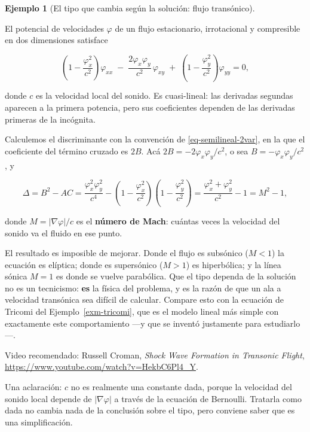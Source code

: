 \documentclass[
  spanish,
  a4paper,
]{scrbook}
\theoremstyle{definition}
\theoremstyle{plain}
\theoremstyle{definition}
\newtheorem{example}{Ejemplo}[chapter]
\theoremstyle{plain}
\theoremstyle{definition}
\theoremstyle{remark}
\begin{document}
\begin{example}[El tipo que cambia según la solución: flujo
transónico]\protect\hypertarget{exm-transonico}{}\label{exm-transonico}

El potencial de velocidades \(\varphi\) de un flujo estacionario,
irrotacional y compresible en dos dimensiones satisface

\[
\left(1 - \frac{\varphi_x^2}{c^2}\right)\varphi_{xx}
\;-\; \frac{2\varphi_x\varphi_y}{c^2}\,\varphi_{xy}
\;+\; \left(1 - \frac{\varphi_y^2}{c^2}\right)\varphi_{yy} = 0 ,
\]

donde \(c\) es la velocidad local del sonido. Es cuasi-lineal: las
derivadas segundas aparecen a la primera potencia, pero sus coeficientes
dependen de las derivadas primeras de la incógnita.

Calculemos el discriminante con la convención de
\ref{eq-semilineal-2var}, en la que el coeficiente del término cruzado
es \(2B\). Acá \(2B = -2\varphi_x\varphi_y/c^2\), o sea
\(B = -\varphi_x\varphi_y/c^2\), y

\[
\Delta = B^2 - AC
= \frac{\varphi_x^2\varphi_y^2}{c^4}
- \left(1-\frac{\varphi_x^2}{c^2}\right)\left(1-\frac{\varphi_y^2}{c^2}\right)
= \frac{\varphi_x^2 + \varphi_y^2}{c^2} - 1 = M^2 - 1 ,
\]

donde \(M = |\nabla\varphi|/c\) es el \textbf{número de Mach}: cuántas
veces la velocidad del sonido va el fluido en ese punto.

El resultado es imposible de mejorar. Donde el flujo es subsónico
(\(M<1\)) la ecuación es elíptica; donde es supersónico (\(M>1\)) es
hiperbólica; y la línea sónica \(M=1\) es donde se vuelve parabólica.
Que el tipo dependa de la solución no es un tecnicismo: \textbf{es} la
física del problema, y es la razón de que un ala a velocidad transónica
sea difícil de calcular. Compare esto con la ecuación de Tricomi del
Ejemplo~\ref{exm-tricomi}, que es el modelo lineal más simple con
exactamente este comportamiento ---y que se inventó justamente para
estudiarlo---.

Video recomendado: Russell Croman, \emph{Shock Wave Formation in
Transonic Flight}, \url{https://www.youtube.com/watch?v=HekbC6Pl4_Y}.

Una aclaración: \(c\) no es realmente una constante dada, porque la
velocidad del sonido local depende de \(|\nabla\varphi|\) a través de la
ecuación de Bernoulli. Tratarla como dada no cambia nada de la
conclusión sobre el tipo, pero conviene saber que es una simplificación.

\end{example}
\end{document}
